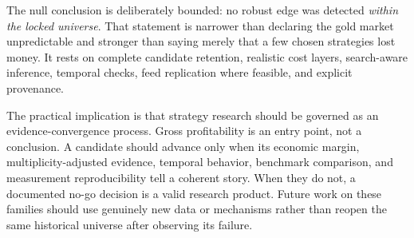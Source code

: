 The null conclusion is deliberately bounded: no robust edge was detected \emph{within the locked universe}. That statement is narrower than declaring the gold market unpredictable and stronger than saying merely that a few chosen strategies lost money. It rests on complete candidate retention, realistic cost layers, search-aware inference, temporal checks, feed replication where feasible, and explicit provenance.

The practical implication is that strategy research should be governed as an evidence-convergence process. Gross profitability is an entry point, not a conclusion. A candidate should advance only when its economic margin, multiplicity-adjusted evidence, temporal behavior, benchmark comparison, and measurement reproducibility tell a coherent story. When they do not, a documented no-go decision is a valid research product. Future work on these families should use genuinely new data or mechanisms rather than reopen the same historical universe after observing its failure.
